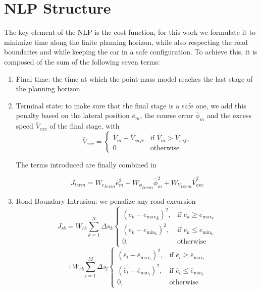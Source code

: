 \documentclass[a4paper, onecolumn, 12pt]{article}
\begin{document}
\newpage
\section{NLP Structure}

The key element of the NLP is the cost function, for this work we formulate it to minimize time along the finite planning horizon, while also respecting the road boundaries and while keeping the car in a safe configuration. To achieve this, it is composed of the sum of the following seven terms:
\begin{enumerate}
    \item Final time: the time at which the point-mass model reaches the last stage of the planning horizon
    \item Terminal state: to make sure that the final stage is a safe one, we add this penalty based on the lateral position ${\bar{e}}_m$, the course error ${\bar{\phi}}_m$ and the excess speed ${\bar{V}}_{exc}$ of the final stage, with
    \begin{equation}
    {\bar{V}}_{exc} = 
    \left\{
	\begin{array}{ll}
		{\bar{V}}_m - {{\bar{V}}_{safe}}
        & \mbox{if } {\bar{V}}_m > {{\bar{V}}_{safe}} \\
	0 & \mbox{otherwise }
	\end{array}
    \right.
    \end{equation}

    The terms introduced are finally combined in
    
    \begin{equation}{J}_{term} = {W_e}_{term}{\bar{e}}_m^2 + {W_{\phi}}_{term}{\bar{\phi}}_m^2 + {W_V}_{term}{\bar{V}}_{exc}^2
    \end{equation}

    \item Road Boundary Intrusion: we penalize any road excursion
    \begin{equation}
    J_{rb} = W_{rb}\sum_{k=1}^{N} \Delta s_k \begin{cases}
    (e_k - {e_{\text{max}}}_k)^2, & \text{if } e_k \geq e_{\text{max}_k} \\
    (e_k - e_{\text{min}_k})^2, & \text{if } e_k \leq e_{\text{min}_k} \\
    0, & \text{otherwise}
    \end{cases}
    \end{equation}
    \[  + W_{rb}\sum_{l=1}^{M} \Delta\overline{s}_l \begin{cases}
    (\overline{e}_l - \overline{e}_{\text{max}_l})^2, & \text{if } \overline{e}_l \geq \overline{e}_{\text{max}_l} \\
    (\overline{e}_l - \overline{e}_{\text{min}_l})^2, & \text{if } \overline{e}_l \leq \overline{e}_{\text{min}_l} \\
    0, & \text{otherwise}
    \end{cases}
    \]


\end{enumerate}
\end{document}
